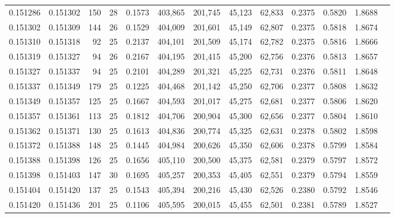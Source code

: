 \begin{tabular}{rrrrrrrrrrrrr}
0.151286 & 0.151302 & 150 &  28 &                                     0.1573 & 403,865 & 201,745 &  45,123 &  62,833 & 0.2375 & 0.5820 & 1.8688 \\
0.151302 & 0.151309 & 144 &  26 &                                     0.1529 & 404,009 & 201,601 &  45,149 &  62,807 & 0.2375 & 0.5818 & 1.8674 \\
0.151310 & 0.151318 &  92 &  25 &                                     0.2137 & 404,101 & 201,509 &  45,174 &  62,782 & 0.2375 & 0.5816 & 1.8666 \\
0.151319 & 0.151327 &  94 &  26 &                                     0.2167 & 404,195 & 201,415 &  45,200 &  62,756 & 0.2376 & 0.5813 & 1.8657 \\
0.151327 & 0.151337 &  94 &  25 &                                     0.2101 & 404,289 & 201,321 &  45,225 &  62,731 & 0.2376 & 0.5811 & 1.8648 \\
0.151337 & 0.151349 & 179 &  25 &                                     0.1225 & 404,468 & 201,142 &  45,250 &  62,706 & 0.2377 & 0.5808 & 1.8632 \\
0.151349 & 0.151357 & 125 &  25 &                                     0.1667 & 404,593 & 201,017 &  45,275 &  62,681 & 0.2377 & 0.5806 & 1.8620 \\
0.151357 & 0.151361 & 113 &  25 &                                     0.1812 & 404,706 & 200,904 &  45,300 &  62,656 & 0.2377 & 0.5804 & 1.8610 \\
0.151362 & 0.151371 & 130 &  25 &                                     0.1613 & 404,836 & 200,774 &  45,325 &  62,631 & 0.2378 & 0.5802 & 1.8598 \\
0.151372 & 0.151388 & 148 &  25 &                                     0.1445 & 404,984 & 200,626 &  45,350 &  62,606 & 0.2378 & 0.5799 & 1.8584 \\
0.151388 & 0.151398 & 126 &  25 &                                     0.1656 & 405,110 & 200,500 &  45,375 &  62,581 & 0.2379 & 0.5797 & 1.8572 \\
0.151398 & 0.151403 & 147 &  30 &                                     0.1695 & 405,257 & 200,353 &  45,405 &  62,551 & 0.2379 & 0.5794 & 1.8559 \\
0.151404 & 0.151420 & 137 &  25 &                                     0.1543 & 405,394 & 200,216 &  45,430 &  62,526 & 0.2380 & 0.5792 & 1.8546 \\
0.151420 & 0.151436 & 201 &  25 &                                     0.1106 & 405,595 & 200,015 &  45,455 &  62,501 & 0.2381 & 0.5789 & 1.8527 \\

\end{tabular}
